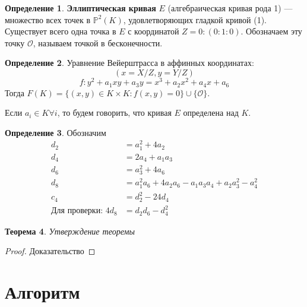 \documentclass[11pt]{article}
\newcommand{\PP}{{{\mathbb P}}}
\newcommand*{\union}{\mathbin{\cup}}
\newcommand{\bigO}{\mathcal{O}}
\newtheorem{theorem}{Теорема}
\theoremstyle{definition}
\newtheorem{definition}[theorem]{Определение}
\begin{document}
            \begin{definition} 
                \textbf{Эллиптическая кривая} $E$ (алгебраическая кривая рода 1) — множество всех точек в $\PP^2(K)$, удовлетворяющих гладкой кривой (1). Существует всего одна точка в $E$ с координатой $Z=0: (0:1:0)$. Обозначаем эту точку $\bigO$, называем точкой в бесконечности. 
            \end{definition}
            
            \begin{definition} 
                Уравнение Вейерштрасса в аффинных координатах: 
                \[
                (x=X/Z, y=Y/Z)
                \]
                \begin{equation}
                    f: y^2+a_1xy + a_3y = x^3 + a_2x^2 + a_4x + a_6
                \end{equation}
                Тогда $F(K) = \{ (x,y) \in K \times K: f(x,y)=0 \} \union \{\bigO\}$.
                
                Если $a_i \in K \forall i$, то будем говорить, что кривая $E$ определена над $K$.
            \end{definition}
            
            \begin{definition}
                Обозначим
                \begin{align}
                    d_2 &= a_1^2 + 4a_2 \\ \nonumber
                    d_4 &= 2a_4 + a_1a_3 \\ \nonumber
                    d_6 &= a_3^2 + 4a_6 \\ \nonumber
                    d_8 &= a_1^2a_6 + 4a_2a_6 - a_1a_3a_4 + a_2a_3^2 - a_4^2 \\ \nonumber
                    c_4 &= d_2^2 - 24d_4 \\ \nonumber
                    \text{Для проверки: } 4d_8 &= d_2d_6 - d_4^2
                \end{align}
            \end{definition}
            
        \begin{theorem}
        	Утверждение теоремы
        \end{theorem}
        
        \begin{proof}
        	Доказательство
        \end{proof}
    
    \section{Алгоритм}
    
\end{document}
